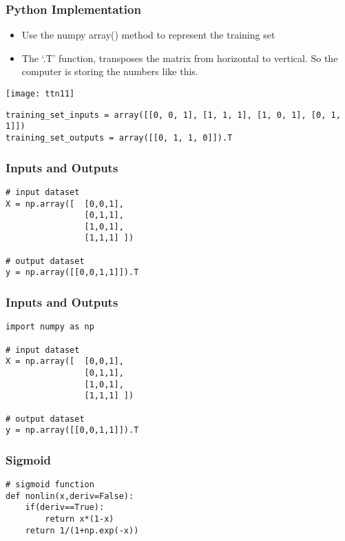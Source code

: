 \begin{frame}[fragile] \frametitle{Python Implementation}
\begin{itemize}
\item Use the numpy array() method to represent the training set 
\item The ‘.T’ function, transposes the matrix from horizontal to vertical. So the computer is storing the numbers like this.
\end{itemize}

\begin{center}
\texttt{[image: ttn11]}
\end{center}

\begin{lstlisting}
training_set_inputs = array([[0, 0, 1], [1, 1, 1], [1, 0, 1], [0, 1, 1]])
training_set_outputs = array([[0, 1, 1, 0]]).T
\end{lstlisting}

\end{frame}

\begin{frame}[fragile] \frametitle{Inputs and Outputs}

\begin{lstlisting}
# input dataset
X = np.array([  [0,0,1],
                [0,1,1],
                [1,0,1],
                [1,1,1] ])
    
# output dataset            
y = np.array([[0,0,1,1]]).T
\end{lstlisting}
\end{frame}


\begin{frame}[fragile] \frametitle{Inputs and Outputs}

\begin{lstlisting}
import numpy as np

# input dataset
X = np.array([  [0,0,1],
                [0,1,1],
                [1,0,1],
                [1,1,1] ])
    
# output dataset            
y = np.array([[0,0,1,1]]).T
\end{lstlisting}
\end{frame}


\begin{frame}[fragile] \frametitle{Sigmoid}

\begin{lstlisting}
# sigmoid function
def nonlin(x,deriv=False):
    if(deriv==True):
        return x*(1-x)
    return 1/(1+np.exp(-x))
\end{lstlisting}
\end{frame}

